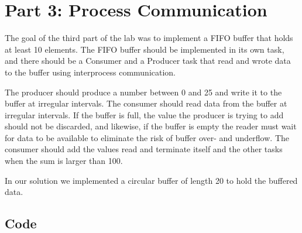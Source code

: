 \documentclass[a4paper,10pt]{article}
\begin{document}
\section{Part 3: Process Communication}

The goal of the third part of the lab was to implement a FIFO buffer that holds at least 10 elements. The FIFO buffer should be implemented in its own task, and there should be a Consumer and a Producer task that read and wrote data to the buffer using interprocess communication.

The producer should produce a number between 0 and 25 and write it to the buffer at irregular intervals. The consumer should read data from the buffer at irregular intervals. If the buffer is full, the value the producer is trying to add should not be discarded, and likewise, if the buffer is empty the reader must wait for data to be available to eliminate the risk of buffer over- and underflow. The consumer should add the values read and terminate itself and the other tasks when the sum is larger than 100.

In our solution we implemented a circular buffer of length 20 to hold the buffered data.

\subsection{Code}
\end{document}
